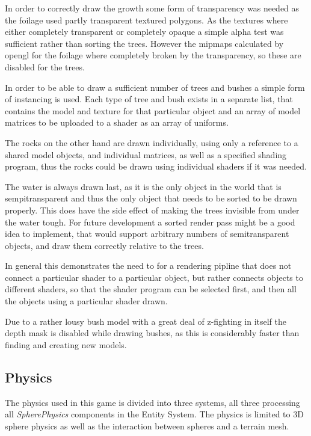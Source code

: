 In order to correctly draw the growth some form of transparency was needed as the foilage used partly transparent textured polygons. As the textures where either completely transparent or completely opaque a simple alpha test was sufficient rather than sorting the trees. However the mipmaps calculated by opengl for the foilage where completely broken by the transparency, so these are disabled for the trees.

In order to be able to draw a sufficient number of trees and bushes a simple form of instancing is used. Each type of tree and bush exists in a separate list, that contains the model and texture for that particular object and an array of model matrices to be uploaded to a shader as an array of uniforms.

The rocks on the other hand are drawn individually, using only a reference to a shared model objects, and individual matrices, as well as a specified shading program, thus the rocks could be drawn using individual shaders if it was needed.

The water is always drawn last, as it is the only object in the world that is sempitransparent and thus the only object that needs to be sorted to be drawn properly. This does have the side effect of making the trees invisible from under the water tough. For future development a sorted render pass might be a good idea to implement, that would support arbitrary numbers of semitransparent objects, and draw them correctly relative to the trees.

In general this demonstrates the need to for a rendering pipline that does not connect a particular shader to a particular object, but rather connects objects to different shaders, so that the shader program can be selected first, and then all the objects using a particular shader drawn.

Due to a rather lousy bush model with a great deal of z-fighting in itself the depth mask is disabled while drawing bushes, as this is considerably faster than finding and creating new models.

\newpage
\subsection{Physics}
The physics used in this game is divided into three systems, all three processing all \textit{SpherePhysics} components in the Entity System. The physics is limited to 3D sphere physics as well as the interaction between spheres and a terrain mesh.

